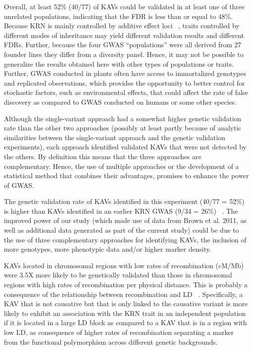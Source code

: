 \documentclass[10pt,letterpaper]{article}
\begin{document}
Overall, at least 52\% (40/77) of KAVs could be validated in at least one of three unrelated populations, indicating that the FDR is less than or equal to 48\%. Because KRN is mainly controlled by additive effect loci ~\cite{Brown2011, Lu2011}, traits controlled by different modes of inheritance may yield different validation results and different FDRs. Further, because the four GWAS “populations” were all derived from 27 founder lines they differ from a diversity panel. Hence, it may not be possible to generalize the results obtained here with other types of populations or traits. Further, GWAS conducted in plants often have access to immortalized genotypes and replicated observations, which provides the opportunity to better control for stochastic factors, such as environmental effects, that could affect the rate of false discovery as compared to GWAS conducted on humans or some other species.

Although the single-variant approach had a somewhat higher genetic validation rate than the other two approaches (possibly at least partly because of analytic similarities between the single-variant approach and the genetic validation experiments), each approach identified validated KAVs that were not detected by the others. By definition this means that the three approaches are complementary. Hence, the use of multiple approaches or the development of a statistical method that combines their advantages, promises to enhance the power of GWAS. 

The genetic validation rate of KAVs identified in this experiment (40/77 = 52\%) is higher than KAVs identified in an earlier KRN GWAS (9/34 = 26\%) ~\cite{Brown2011}. The improved power of our study (which made use of data from Brown et al. 2011, as well as additional data generated as part of the current study) could be due to the use of three complementary approaches for identifying KAVs, the inclusion of more genotypes, more phenotypic data and/or higher marker density. 

KAVs located in chromosomal regions with low rates of recombination (cM/Mb) were 3.5X more likely to be genetically validated than those in chromosomal regions with high rates of recombination per physical distance. This is probably a consequence of the relationship between recombination and LD ~\cite{Kim2007}. Specifically, a KAV that is not causative but that is only linked to the causative variant is more likely to exhibit an association with the KRN trait in an independent population if it is located in a large LD block as compared to a KAV that is in a region with low LD, as consequence of higher rates of recombination separating a marker from the functional polymorphism across different genetic backgrounds.
\end{document}
